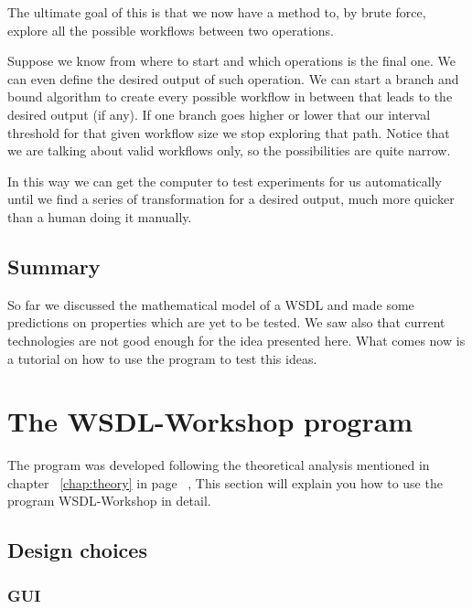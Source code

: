 \documentclass[a4paper,10pt]{article}
\begin{document}
  The ultimate goal of this is that we now have a method to, by brute force, explore all the possible workflows between two operations.\vspace{3 mm}

  Suppose we know from where to start and which operations is the final one. We can even define the desired output of such operation. We can start a branch and bound algorithm to create every possible workflow in between that leads to the desired output (if any). If one branch goes higher or lower that our interval threshold for that given workflow size we stop exploring that path. Notice that we are talking about valid workflows only, so the possibilities are quite narrow.\vspace{3 mm}

  In this way we can get the computer to test experiments for us automatically until we find a series of transformation for a desired output, much more quicker than a human doing it manually.

  \subsection{Summary}

  So far we discussed the mathematical model of a WSDL and made some predictions on properties which are yet to be tested. We saw also that current technologies are not good enough for the idea presented here. What comes now is a tutorial on how to use the program to test this ideas.

\newpage

\section{The WSDL-Workshop program}

The program was developed following the theoretical analysis mentioned in chapter ~\ref{chap:theory} in page ~\pageref{chap:theory}, This section will explain you how to use the program WSDL-Workshop in detail.

  \subsection{Design choices}

    \subsubsection{GUI}
\end{document}
